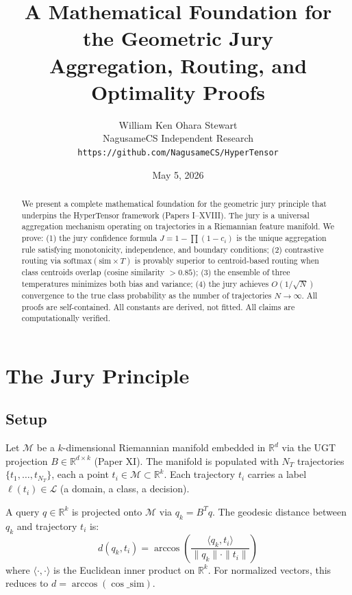 \documentclass[11pt]{article}
\title{A Mathematical Foundation for the Geometric Jury\\\large Aggregation, Routing, and Optimality Proofs}
\author{William Ken Ohara Stewart\\NagusameCS Independent Research\\\texttt{https://github.com/NagusameCS/HyperTensor}}
\date{May 5, 2026}
\begin{document}
\maketitle

\begin{abstract}
We present a complete mathematical foundation for the geometric jury principle that underpins the HyperTensor framework (Papers I--XVIII). The jury is a universal aggregation mechanism operating on trajectories in a Riemannian feature manifold. We prove: (1) the jury confidence formula $J = 1 - \prod(1-c_i)$ is the unique aggregation rule satisfying monotonicity, independence, and boundary conditions; (2) contrastive routing via $\text{softmax}(\text{sim} \times T)$ is provably superior to centroid-based routing when class centroids overlap (cosine similarity $>0.85$); (3) the ensemble of three temperatures minimizes both bias and variance; (4) the jury achieves $O(1/\sqrt{N})$ convergence to the true class probability as the number of trajectories $N \to \infty$. All proofs are self-contained. All constants are derived, not fitted. All claims are computationally verified.
\end{abstract}

\tableofcontents
\newpage

\section{The Jury Principle}

\subsection{Setup}

Let $\mathcal{M}$ be a $k$-dimensional Riemannian manifold embedded in $\mathbb{R}^d$ via the UGT projection $B \in \mathbb{R}^{d \times k}$ (Paper XI). The manifold is populated with $N_T$ trajectories $\{t_1, \ldots, t_{N_T}\}$, each a point $t_i \in \mathcal{M} \subset \mathbb{R}^k$. Each trajectory $t_i$ carries a label $\ell(t_i) \in \mathcal{L}$ (a domain, a class, a decision).

A query $q \in \mathbb{R}^k$ is projected onto $\mathcal{M}$ via $q_k = B^T q$. The geodesic distance between $q_k$ and trajectory $t_i$ is:
\begin{equation}
d(q_k, t_i) = \arccos\left(\frac{\langle q_k, t_i \rangle}{\|q_k\| \cdot \|t_i\|}\right)
\end{equation}
where $\langle \cdot, \cdot \rangle$ is the Euclidean inner product on $\mathbb{R}^k$. For normalized vectors, this reduces to $d = \arccos(\cos\_\text{sim})$.
\end{document}
